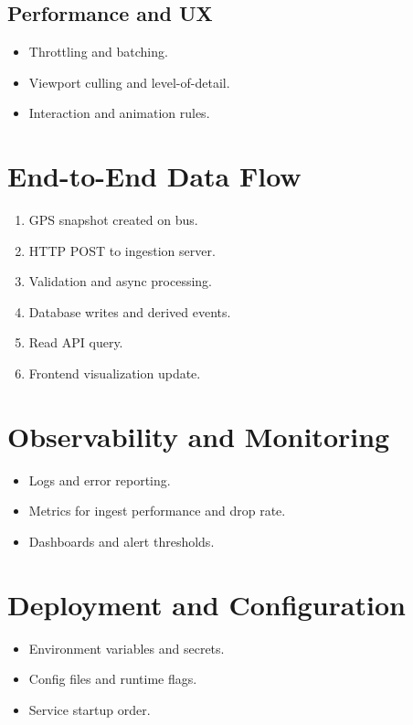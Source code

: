 \documentclass[12pt, a4paper]{article}
\begin{document}
\subsection{Performance and UX}
\begin{itemize}[leftmargin=*]
    \item Throttling and batching.
    \item Viewport culling and level-of-detail.
    \item Interaction and animation rules.
\end{itemize}

\section{End-to-End Data Flow}
\begin{enumerate}[leftmargin=*]
    \item GPS snapshot created on bus.
    \item HTTP POST to ingestion server.
    \item Validation and async processing.
    \item Database writes and derived events.
    \item Read API query.
    \item Frontend visualization update.
\end{enumerate}

\section{Observability and Monitoring}
\begin{itemize}[leftmargin=*]
    \item Logs and error reporting.
    \item Metrics for ingest performance and drop rate.
    \item Dashboards and alert thresholds.
\end{itemize}

\section{Deployment and Configuration}
\begin{itemize}[leftmargin=*]
    \item Environment variables and secrets.
    \item Config files and runtime flags.
    \item Service startup order.
\end{itemize}
\end{document}
